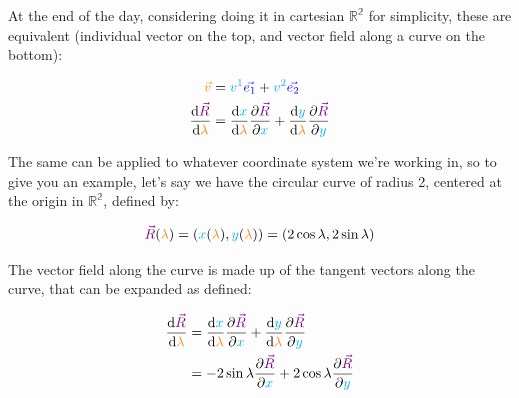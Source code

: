 At the end of the day, considering doing it in cartesian $\mathbb{R^2}$ for simplicity, these are equivalent (individual vector on the top, and vector field along a curve on the bottom):

\begin{align*}
    \begingroup\color{orange}\vec{v}\endgroup &= \begingroup\color{cyan}v^1\endgroup \begingroup\color{blue}\vec{e_1}\endgroup + \begingroup\color{cyan}v^2\endgroup \begingroup\color{blue}\vec{e_2}\endgroup\\
    \frac{\dd \begingroup\color{violet}\vec{R}\endgroup}{\dd \begingroup\color{orange}\lambda\endgroup} &= \frac{\dd \begingroup\color{cyan}x\endgroup}{\dd \begingroup\color{orange}\lambda\endgroup}
    \frac{\partial \begingroup\color{violet}\vec{R}\endgroup}{\partial \begingroup\color{cyan}x\endgroup} + 
    \frac{\dd \begingroup\color{cyan}y\endgroup}{\dd \begingroup\color{orange}\lambda\endgroup}
    \frac{\partial \begingroup\color{violet}\vec{R}\endgroup}{\partial \begingroup\color{cyan}y\endgroup}
\end{align*}

The same can be applied to whatever coordinate system we're working in, so to give you an example, let's say we
have the circular curve of radius 2, centered at the origin in $\mathbb{R^2}$, defined by:

\begin{equation}
    \begingroup\color{violet}\vec{R}\endgroup (\begingroup\color{orange}\lambda\endgroup) = \left(\begingroup\color{cyan}x\endgroup(\begingroup\color{orange}\lambda\endgroup), \begingroup\color{cyan}y\endgroup(\begingroup\color{orange}\lambda\endgroup)\right) =
    \left(2 \cos\lambda, 2 \sin\lambda\right)
\end{equation}

The vector field along the curve is made up of the tangent vectors along the curve, that 
can be expanded as defined:

\begin{align*}
    \frac{\dd \begingroup\color{violet}\vec{R}\endgroup}{\dd \begingroup\color{orange}\lambda\endgroup} &= \frac{\dd \begingroup\color{cyan}x\endgroup}{\dd \begingroup\color{orange}\lambda\endgroup}
    \frac{\partial \begingroup\color{violet}\vec{R}\endgroup}{\partial \begingroup\color{cyan}x\endgroup} + 
    \frac{\dd \begingroup\color{cyan}y\endgroup}{\dd \begingroup\color{orange}\lambda\endgroup}
    \frac{\partial \begingroup\color{violet}\vec{R}\endgroup}{\partial \begingroup\color{cyan}y\endgroup}\\
    &= -2 \sin\lambda \frac{\partial \begingroup\color{violet}\vec{R}\endgroup}{\partial \begingroup\color{cyan}x\endgroup} + 
    2 \cos\lambda\frac{\partial \begingroup\color{violet}\vec{R}\endgroup}{\partial \begingroup\color{cyan}y\endgroup}
\end{align*}

